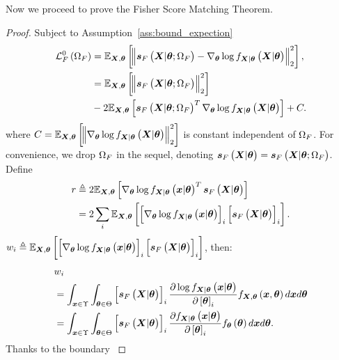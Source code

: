 Now we proceed to prove the {Fisher Score Matching} Theorem.  
\begin{proof}
{%
Subject to Assumption~\ref{ass:bound_expection} %
}
\begin{align}\label{eq:step_one_proof_alt}
        \lossfs\brackets{\paramf}&=\expectation{\norm{\lscore{\X}{\p;\paramf}-\nabla_{\p}\log\probt{\randomvec{X}|\p}{\X|\p}}_2^2}{\randomvec{X},\p},\nonumber\\
        &=\expectation{\norm{\lscore{\X}{\p;\paramf}}_2^2}{\randomvec{X},\p}\nonumber\\
        &-2\expectation{\lscore{\X}{\p;\paramf}^T\nabla_{\p}\log\probt{\randomvec{X}|\p}{\X|\p}}{\randomvec{X},\p}+C.
    \end{align}
    where $C=\expectation{\norm{\nabla_{\p}\log\probt{\randomvec{X}|\p}{\X|\p}}_2^2}{\randomvec{X},\p}$  is constant independent of $\Omega_{F}$. %
     {%
    For convenience, we drop $\Omega_{F}$ 
    in the sequel, 
    denoting
    $\lscore{\X}{\p}=\lscore{\X}{\p;\paramf}$. }
    Define
\begin{align}\label{eq:direct_r_define_v2}
    r&\triangleq2\expectation{\nabla_{\p}\log\probt{\vectorsym{x}|\p}{\X|\p}^T\lscore{\X}{\p}}{\randomvec{X},\p}\nonumber\\
    &=2\sum_i\expectation{\squareb{\nabla_{\p}\log\probt{\vectorsym{x}|\p}{\X|\p}}_i\squareb{\lscore{\X}{\p}}_i}{\randomvec{X},\p}.
\end{align}
$w_i\triangleq\expectation{\squareb{\nabla_{\p}\log\probt{\vectorsym{x}|\p}{\X|\p}}_i\squareb{\lscore{\X}{\p}}_i}{\randomvec{X},\p}$, then:
\begin{align}\label{eq:w_before_egt}
    &w_i\\
    &=\int_{\x\in\Upsilon}\int_{\p\in\Theta} \squareb{\lscore{\X}{\p}}_i\divc{\log\probt{\vectorsym{x}|\p}{\X|\p}}{\squareb{\p}_i} \probt{\x,\p}{\X,\p}d\x d\p\nonumber\\
    &=\int_{\x\in\Upsilon}\int_{\p\in\Theta} \squareb{\lscore{\X}{\p}}_i\divc{\probt{\vectorsym{x}|\p}{\X|\p}}{\squareb{\p}_i} \probt{\p}{\p}d\x d\p.\nonumber
\end{align}
     {%
    Thanks to the boundary 
}
\end{proof}
